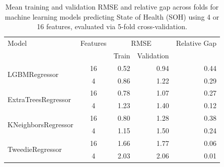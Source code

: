\begin{table}[H]
    \centering
    \caption{Mean training and validation RMSE and relative gap across folds for machine learning models predicting State of Health (SOH) using 4 or 16 features, evaluated via 5-fold cross-validation.}
    \label{tab:soh_optim}
    \begin{tabular}{lcrrr}
    \toprule
    Model & Features & \multicolumn{2}{c}{RMSE} & Relative Gap \\
    \cmidrule(lr){3-4}
          &          & Train & Validation & \\
    \midrule
    \multirow{2}{*}{LGBMRegressor}       & 16 & 0.52 & 0.94 & 0.44 \\
                                         & 4  & 0.86 & 1.22 & 0.29 \\
    \cmidrule{1-5}
    \multirow{2}{*}{ExtraTreesRegressor} & 16 & 0.78 & 1.07 & 0.27 \\
                                         & 4  & 1.23 & 1.40 & 0.12 \\
    \cmidrule{1-5}
    \multirow{2}{*}{KNeighborsRegressor} & 16 & 0.80 & 1.28 & 0.38 \\
                                         & 4  & 1.15 & 1.50 & 0.24 \\
    \cmidrule{1-5}
    \multirow{2}{*}{TweedieRegressor}    & 16 & 1.66 & 1.77 & 0.06 \\
                                         & 4  & 2.03 & 2.06 & 0.01 \\
    \bottomrule
    \end{tabular}
\end{table}


